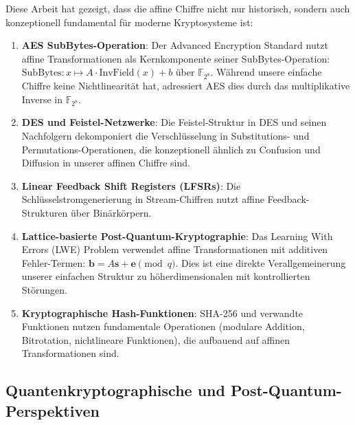﻿\documentclass[12pt,a4paper]{article}
\begin{document}
	Diese Arbeit hat gezeigt, dass die affine Chiffre nicht nur historisch, sondern auch konzeptionell fundamental für moderne Kryptosysteme ist:
	
	\begin{enumerate}
		\item \textbf{AES SubBytes-Operation}: Der Advanced Encryption Standard nutzt affine Transformationen als Kernkomponente seiner SubBytes-Operation: $\text{SubBytes}: x \mapsto A \cdot \text{InvField}(x) + b$ über $\mathbb{F}_{2^8}$. Während unsere einfache Chiffre keine Nichtlinearität hat, adressiert AES dies durch das multiplikative Inverse in $\mathbb{F}_{2^8}$.
		
		\item \textbf{DES und Feistel-Netzwerke}: Die Feistel-Struktur in DES und seinen Nachfolgern dekomponiert die Verschlüsselung in Substitutions- und Permutations-Operationen, die konzeptionell ähnlich zu Confusion und Diffusion in unserer affinen Chiffre sind.
		
		\item \textbf{Linear Feedback Shift Registers (LFSRs)}: Die Schlüsselstromgenerierung in Stream-Chiffren nutzt affine Feedback-Strukturen über Binärkörpern.
		
		\item \textbf{Lattice-basierte Post-Quantum-Kryptographie}: Das Learning With Errors (LWE) Problem verwendet affine Transformationen mit additiven Fehler-Termen: $\mathbf{b} = A\mathbf{s} + \mathbf{e} \pmod{q}$. Dies ist eine direkte Verallgemeinerung unserer einfachen Struktur zu höherdimensionalen mit kontrollierten Störungen.
		
		\item \textbf{Kryptographische Hash-Funktionen}: SHA-256 und verwandte Funktionen nutzen fundamentale Operationen (modulare Addition, Bitrotation, nichtlineare Funktionen), die aufbauend auf affinen Transformationen sind.
	\end{enumerate}
	
	\subsection{Quantenkryptographische und Post-Quantum-Perspektiven}
	
\end{document}
